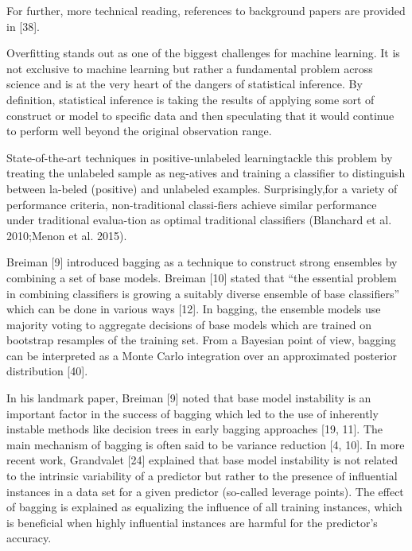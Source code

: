 For further, more technical reading, references to background papers are provided in [38].

Overﬁtting stands out as one of the biggest challenges for machine learning. It is not exclusive to machine learning but rather a fundamental problem across science and is at the very heart of the dangers of statistical inference. By deﬁnition, statistical inference is taking the results of applying some sort of construct or model to speciﬁc data and then speculating that it would continue to perform well beyond the original observation range.

State-of-the-art techniques in positive-unlabeled learningtackle this problem by treating the unlabeled sample as neg-atives and training a classiﬁer to distinguish between la-beled (positive) and unlabeled examples. 
Surprisingly,for a variety of performance criteria, non-traditional classi-ﬁers achieve similar performance under traditional evalua-tion as optimal traditional classiﬁers (Blanchard et al. 2010;Menon et al. 2015). 

Breiman [9] introduced bagging as a technique to construct strong ensembles by combining a set of base models. Breiman [10] stated that “the essential problem in combining classiﬁers is growing a suitably diverse ensemble of base classiﬁers” which can be done in various ways [12]. In bagging, the ensemble models use majority voting to aggregate decisions of base models which are trained on bootstrap resamples of the training set. From a Bayesian point of view, bagging can be interpreted as a Monte Carlo integration over an approximated posterior distribution [40]. 

In his landmark paper, Breiman [9] noted that base model instability is an important factor in the success of bagging which led to the use of inherently instable methods like decision trees in early bagging approaches [19, 11]. The main mechanism of bagging is often said to be variance reduction [4, 10]. In more recent work, Grandvalet [24] explained that base model instability is not related to the intrinsic variability of a predictor but rather to the presence of inﬂuential instances in a data set for a given predictor (so-called leverage points).
The eﬀect of bagging is explained as equalizing the inﬂuence of all training instances, which is beneﬁcial when highly inﬂuential instances are harmful for the predictor’s accuracy.

